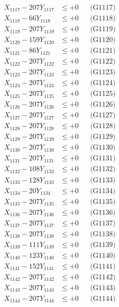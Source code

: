 \documentclass[a4paper,10pt]{article}
\begin{document}
{\begin{align}
X_{1117} - 207Y_{1117} &\leq +0 && \text{(G1117)} \\
X_{1118} - 66Y_{1118} &\leq +0 && \text{(G1118)} \\
X_{1119} - 207Y_{1119} &\leq +0 && \text{(G1119)} \\
X_{1120} - 159Y_{1120} &\leq +0 && \text{(G1120)} \\
\allowbreak
X_{1121} - 86Y_{1121} &\leq +0 && \text{(G1121)} \\
X_{1122} - 207Y_{1122} &\leq +0 && \text{(G1122)} \\
X_{1123} - 207Y_{1123} &\leq +0 && \text{(G1123)} \\
X_{1124} - 207Y_{1124} &\leq +0 && \text{(G1124)} \\
X_{1125} - 207Y_{1125} &\leq +0 && \text{(G1125)} \\
X_{1126} - 207Y_{1126} &\leq +0 && \text{(G1126)} \\
X_{1127} - 207Y_{1127} &\leq +0 && \text{(G1127)} \\
X_{1128} - 207Y_{1128} &\leq +0 && \text{(G1128)} \\
X_{1129} - 207Y_{1129} &\leq +0 && \text{(G1129)} \\
X_{1130} - 207Y_{1130} &\leq +0 && \text{(G1130)} \\
\allowbreak
X_{1131} - 207Y_{1131} &\leq +0 && \text{(G1131)} \\
X_{1132} - 108Y_{1132} &\leq +0 && \text{(G1132)} \\
X_{1133} - 128Y_{1133} &\leq +0 && \text{(G1133)} \\
X_{1134} - 20Y_{1134} &\leq +0 && \text{(G1134)} \\
X_{1135} - 207Y_{1135} &\leq +0 && \text{(G1135)} \\
X_{1136} - 207Y_{1136} &\leq +0 && \text{(G1136)} \\
X_{1137} - 207Y_{1137} &\leq +0 && \text{(G1137)} \\
X_{1138} - 207Y_{1138} &\leq +0 && \text{(G1138)} \\
X_{1139} - 111Y_{1139} &\leq +0 && \text{(G1139)} \\
X_{1140} - 123Y_{1140} &\leq +0 && \text{(G1140)} \\
\allowbreak
X_{1141} - 152Y_{1141} &\leq +0 && \text{(G1141)} \\
X_{1142} - 207Y_{1142} &\leq +0 && \text{(G1142)} \\
X_{1143} - 207Y_{1143} &\leq +0 && \text{(G1143)} \\
X_{1144} - 207Y_{1144} &\leq +0 && \text{(G1144)} \\

\end{align}}
\end{document}
